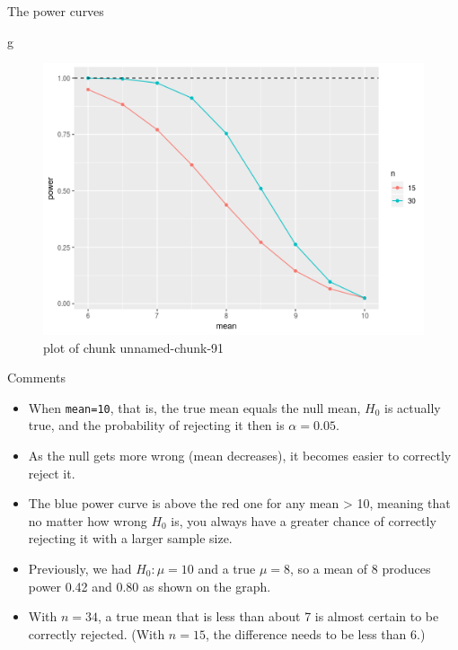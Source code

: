 \documentclass[ignorenonframetext,]{beamer}
\newenvironment{Shaded}{\begin{snugshade}}{\end{snugshade}}
\newcommand{\NormalTok}[1]{#1}
\providecommand{\tightlist}{%
  \setlength{\itemsep}{0pt}\setlength{\parskip}{0pt}}
\begin{document}
\begin{frame}[fragile]{The power curves}
\protect\hypertarget{the-power-curves}{}

\begin{Shaded}
\begin{Highlighting}[]
\NormalTok{g}
\end{Highlighting}
\end{Shaded}

\begin{figure}
\centering
\includegraphics{figure/unnamed-chunk-91-1.png}
\caption{plot of chunk unnamed-chunk-91}
\end{figure}

\end{frame}

\begin{frame}[fragile]{Comments}
\protect\hypertarget{comments-3}{}

\begin{itemize}
\tightlist
\item
  When \texttt{mean=10}, that is, the true mean equals the null mean,
  \(H_0\) is actually true, and the probability of rejecting it then is
  \(\alpha = 0.05\).
\item
  As the null gets more wrong (mean decreases), it becomes easier to
  correctly reject it.
\item
  The blue power curve is above the red one for any mean \textgreater{}
  10, meaning that no matter how wrong \(H_0\) is, you always have a
  greater chance of correctly rejecting it with a larger sample size.
\item
  Previously, we had \(H_0 : \mu = 10\) and a true \(\mu = 8\), so a
  mean of 8 produces power 0.42 and 0.80 as shown on the graph.
\item
  With \(n = 34\), a true mean that is less than about 7 is almost
  certain to be correctly rejected. (With \(n = 15\), the difference
  needs to be less than 6.)
\end{itemize}

\end{frame}
\end{document}
